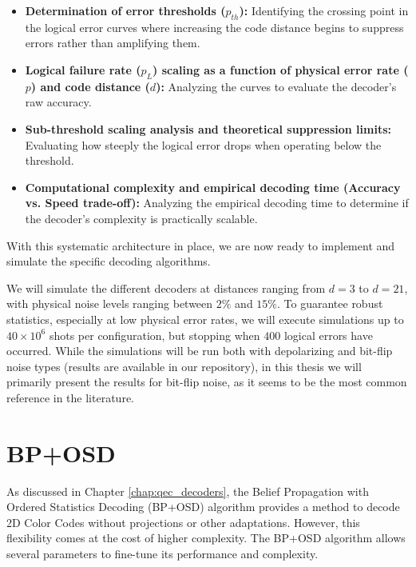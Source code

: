 \begin{itemize}
    \item \textbf{Determination of error thresholds ($p_{th}$):} Identifying the crossing point in the logical error curves where increasing the code distance begins to suppress errors rather than amplifying them.
    \item \textbf{Logical failure rate ($p_L$) scaling as a function of physical error rate ($p$) and code distance ($d$):} Analyzing the curves to evaluate the decoder's raw accuracy.
    \item \textbf{Sub-threshold scaling analysis and theoretical suppression limits:} Evaluating how steeply the logical error drops when operating below the threshold.
    \item \textbf{Computational complexity and empirical decoding time (Accuracy vs. Speed trade-off):} Analyzing the empirical decoding time to determine if the decoder's complexity is practically scalable.
\end{itemize}

With this systematic architecture in place, we are now ready to implement and simulate the specific decoding algorithms.

We will simulate the different decoders at distances ranging from $d=3$ to $d=21$, with physical noise levels ranging between $2\%$ and $15\%$. To guarantee robust statistics, especially at low physical error rates, we will execute simulations up to $40 \times 10^6$ shots per configuration, but stopping when $400$ logical errors have occurred. While the simulations will be run both with depolarizing and bit-flip noise types (results are available in our repository), in this thesis we will primarily present the results for bit-flip noise, as it seems to be the most common reference in the literature.


\section{BP+OSD}
\label{sec:bp_osd_simulation}

As discussed in Chapter \ref{chap:qec_decoders}, the Belief Propagation with Ordered Statistics Decoding (BP+OSD) algorithm provides a method to decode 2D Color Codes without projections or other adaptations. However, this flexibility comes at the cost of higher complexity. The BP+OSD algorithm allows several parameters to fine-tune its performance and complexity. 

